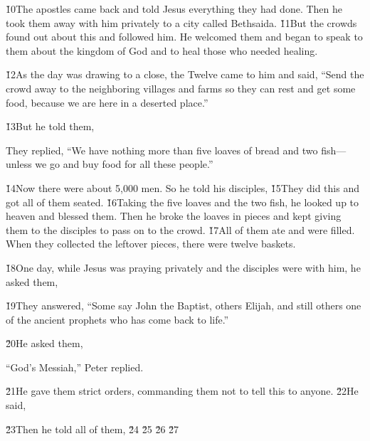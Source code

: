 \v{10}The apostles came back and told Jesus everything they had done. Then he took them away with him privately to a city called Bethsaida. \v{11}But the crowds found out about this and followed him. He welcomed them and began to speak to them about the kingdom of God and to heal those who needed healing.

\v{12}As the day was drawing to a close, the Twelve came to him and said, ``Send the crowd away to the neighboring villages and farms so they can rest and get some food, because we are here in a deserted place.''

\v{13}But he told them, 

They replied, ``We have nothing more than five loaves of bread and two fish---unless we go and buy food for all these people.''

\v{14}Now there were about 5,000 men. So he told his disciples,  \v{15}They did this and got all of them seated. \v{16}Taking the five loaves and the two fish, he looked up to heaven and blessed them. Then he broke the loaves in pieces and kept giving them to the disciples to pass on to the crowd. \v{17}All of them ate and were filled. When they collected the leftover pieces, there were twelve baskets.

\v{18}One day, while Jesus was praying privately and the disciples were with him, he asked them, 

\v{19}They answered, ``Some say John the Baptist, others Elijah, and still others one of the ancient prophets who has come back to life.''

\v{20}He asked them, 

``God's Messiah,'' Peter replied.

\v{21}He gave them strict orders, commanding them not to tell this to anyone. \v{22}He said, 

\v{23}Then he told all of them,  \v{24} \v{25} \v{26} \v{27}

